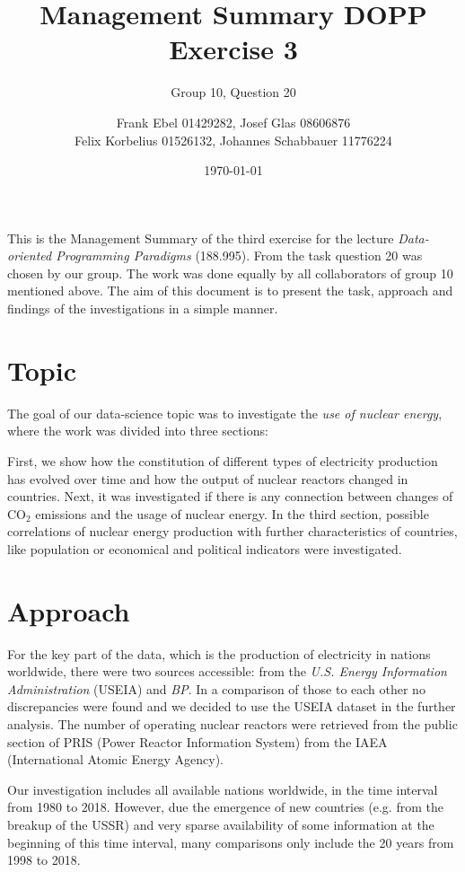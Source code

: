 \documentclass[a4paper,10pt,twocolumn]{scrartcl}
\author{Frank Ebel 01429282, Josef Glas 08606876\\Felix Korbelius 01526132, Johannes Schabbauer 11776224}
\title{\vspace*{-1cm}Management Summary DOPP Exercise 3}
\subtitle{Group 10, Question 20}
\date{\today \vspace*{-0.8cm}}
\begin{document}
\sffamily
\maketitle

This is the Management Summary of the third exercise for the lecture \emph{Data-oriented Programming Paradigms} (188.995).  From the task question 20 was chosen by our group. The work was done equally by all collaborators of group 10 mentioned above. The aim of this document is to present the task, approach and findings of the investigations in a simple manner.

\section{Topic}

The goal of our data-science topic was to investigate the \emph{use of nuclear energy}, where the work was divided into three sections:

First, we show how the constitution of different types of electricity production has evolved over time and how the output of nuclear reactors changed in countries. Next, it was investigated if there is any connection between changes of CO$_2$ emissions and the usage of nuclear energy. In the third section, possible correlations of nuclear energy production with further characteristics of countries, like population or economical and political indicators were investigated.

\section{Approach}

For the key part of the data, which is the production of electricity in nations worldwide, there were two sources accessible: from the \emph{U.S. Energy Information Administration} (USEIA) and \emph{BP}. In a comparison of those to each other no discrepancies were found and we decided to use the USEIA dataset in the further analysis. 
The number of operating nuclear reactors were retrieved from the public section of PRIS (Power Reactor Information System) from the IAEA (International Atomic Energy Agency).

Our investigation includes all available nations worldwide, in the time interval from 1980 to 2018. However, due the emergence of new countries (e.g. from the breakup of the USSR) and very sparse availability of some information at the beginning of this time interval, many comparisons only include the 20 years from 1998 to 2018. 
\end{document}
